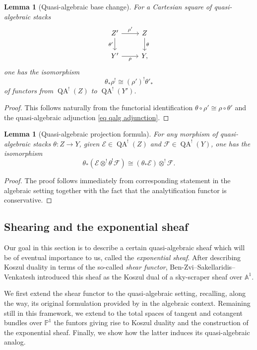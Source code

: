 \documentclass[11pt, a4paper]{amsart}
\numberwithin{equation}{section}
\newtheorem{lemma}[theorem]{Lemma}
\theoremstyle{definition}
\theoremstyle{remark}
\DeclareMathOperator{\QA}{QA}
\newcommand{\Ee}{\mathcal{E}}
\newcommand{\Ff}{\mathcal{F}}
\renewcommand{\AA}{\mathbb{A}}
\newcommand{\PP}{\mathbb{P}}
\renewcommand{\to}{\longrightarrow}
\begin{document}
\begin{lemma}[Quasi-algebraic base change]
For a Cartesian square of quasi-algebraic stacks
\[
\begin{tikzcd}
Z' & Z
\\
Y' & Y
\arrow[from=1-1, to=1-2, "\rho'"]
\arrow[from=1-1, to=2-1, "\theta'"']
\arrow[from=1-2, to=2-2, "\theta"]
\arrow[from=2-1, to=2-2, "\rho"'],
\end{tikzcd}
\]
one has the isomorphism  
\[
\theta_*\rho^! \cong (\rho')^! \theta'_*
\]
of functors from $\QA^!(Z)$ to $\QA^!(Y')$.
\end{lemma}

\begin{proof}
This follows naturally from the functorial identification $\theta \circ \rho' \cong \rho \circ \theta'$ and the quasi-algebraic adjunction \eqref{eq qalg adjunction}.
\end{proof}


\begin{lemma}[Quasi-algebraic projection formula]
For any morphism of quasi-algebraic stacks $\theta : Z \to Y$, given $\Ee \in \QA^!(Z)$ and $\Ff \in \QA^!(Y)$, one has the isomorphism
\[
\theta_* \left ( \Ee \otimes^! \theta^! \Ff \right ) \cong \left ( \theta_* \Ee \right ) \otimes^! \Ff.
\]
\end{lemma}

\begin{proof}
The proof follows immediately from corresponding statement in the algebraic setting together with the fact that the analytification functor is conservative.
\end{proof}






\subsection{Shearing and the exponential sheaf}

Our goal in this section is to describe a certain quasi-algebraic sheaf which will be of eventual importance to us, called the \textit{exponential sheaf}. After describing Koszul duality in terms of the so-called {\it shear functor}, Ben-Zvi--Sakellaridis--Venkatesh  introduced this sheaf as the Koszul dual of a sky-scraper sheaf over $\AA^1$. 

We first extend the shear functor to the quasi-algebraic setting, recalling, along the way, its original formulation provided by \cite{BZSV} in the algebraic context. Remaining still in this framework, we extend to the total spaces of tangent and cotangent bundles over $\PP^1$ the funtors giving rise to Koszul duality and the construction of the exponential sheaf. Finally, we show how the latter induces its quasi-algebraic analog.
\end{document}
